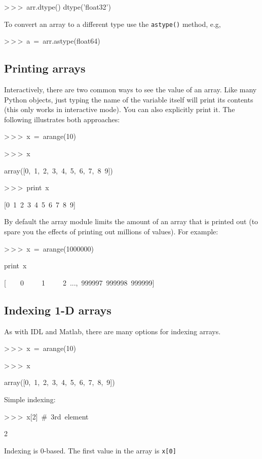 \begin{lyxcode}
>\,{}>\,{}>~arr.dtype()
dtype('float32')
\end{lyxcode}
To convert an array to a different type use the \texttt{astype()}
method, e.g,

\begin{lyxcode}
>\,{}>\,{}>~a~=~arr.astype(float64)
\end{lyxcode}

\subsection{Printing arrays}

Interactively, there are two common ways to see the value of an array.
Like many Python objects, just typing the name of the variable itself
will print its contents (this only works in interactive mode). You
can also explicitly print it. The following illustrates both approaches:

\begin{lyxcode}
>\,{}>\,{}>~x~=~arange(10)

>\,{}>\,{}>~x

array({[}0,~1,~2,~3,~4,~5,~6,~7,~8~9])

>\,{}>\,{}>~print~x

{[}0~1~2~3~4~5~6~7~8~9]
\end{lyxcode}
By default the array module limits the amount of an array that is
printed out (to spare you the effects of printing out millions of
values). For example:

\begin{lyxcode}
>\,{}>\,{}>~x~=~arange(1000000)

print~x

{[}~~~~0~~~~~1~~~~~2~...,~999997~999998~999999]
\end{lyxcode}

\subsection{Indexing 1-D arrays}

As with IDL and Matlab, there are many options for indexing arrays.

\begin{lyxcode}
>\,{}>\,{}>~x~=~arange(10)

>\,{}>\,{}>~x

array({[}0,~1,~2,~3,~4,~5,~6,~7,~8,~9])
\end{lyxcode}
Simple indexing:

\begin{lyxcode}
>\,{}>\,{}>~x{[}2]~\#~3rd~element

2
\end{lyxcode}
Indexing is 0-based. The first value in the array is \texttt{x{[}0]}

